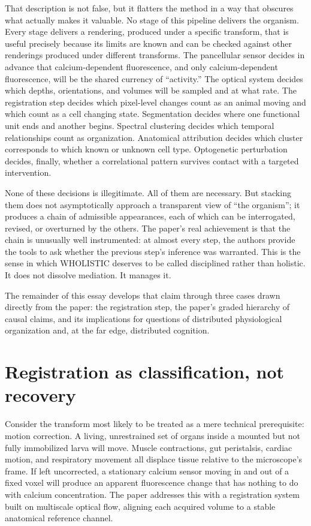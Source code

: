 \documentclass[11pt]{article}
\begin{document}
That description is not false, but it flatters the method in a way that obscures what actually makes it valuable. No stage of this pipeline delivers the organism. Every stage delivers a rendering, produced under a specific transform, that is useful precisely because its limits are known and can be checked against other renderings produced under different transforms. The pancellular sensor decides in advance that calcium-dependent fluorescence, and only calcium-dependent fluorescence, will be the shared currency of ``activity.'' The optical system decides which depths, orientations, and volumes will be sampled and at what rate. The registration step decides which pixel-level changes count as an animal moving and which count as a cell changing state. Segmentation decides where one functional unit ends and another begins. Spectral clustering decides which temporal relationships count as organization. Anatomical attribution decides which cluster corresponds to which known or unknown cell type. Optogenetic perturbation decides, finally, whether a correlational pattern survives contact with a targeted intervention.

None of these decisions is illegitimate. All of them are necessary. But stacking them does not asymptotically approach a transparent view of ``the organism''; it produces a chain of admissible appearances, each of which can be interrogated, revised, or overturned by the others. The paper's real achievement is that the chain is unusually well instrumented: at almost every step, the authors provide the tools to ask whether the previous step's inference was warranted. This is the sense in which WHOLISTIC deserves to be called disciplined rather than holistic. It does not dissolve mediation. It manages it.

The remainder of this essay develops that claim through three cases drawn directly from the paper: the registration step, the paper's graded hierarchy of causal claims, and its implications for questions of distributed physiological organization and, at the far edge, distributed cognition.

\section{Registration as classification, not recovery}

Consider the transform most likely to be treated as a mere technical prerequisite: motion correction. A living, unrestrained set of organs inside a mounted but not fully immobilized larva will move. Muscle contractions, gut peristalsis, cardiac motion, and respiratory movement all displace tissue relative to the microscope's frame. If left uncorrected, a stationary calcium sensor moving in and out of a fixed voxel will produce an apparent fluorescence change that has nothing to do with calcium concentration. The paper addresses this with a registration system built on multiscale optical flow, aligning each acquired volume to a stable anatomical reference channel.
\end{document}
